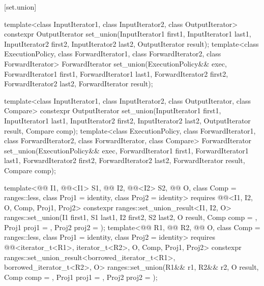 [set.union]{}

%
\begin{itemdecl}
template<class InputIterator1, class InputIterator2, class OutputIterator>
  constexpr OutputIterator
    set_union(InputIterator1 first1, InputIterator1 last1,
              InputIterator2 first2, InputIterator2 last2,
              OutputIterator result);
template<class ExecutionPolicy, class ForwardIterator1, class ForwardIterator2,
         class ForwardIterator>
  ForwardIterator
    set_union(ExecutionPolicy&& exec,
              ForwardIterator1 first1, ForwardIterator1 last1,
              ForwardIterator2 first2, ForwardIterator2 last2,
              ForwardIterator result);

template<class InputIterator1, class InputIterator2, class OutputIterator, class Compare>
  constexpr OutputIterator
    set_union(InputIterator1 first1, InputIterator1 last1,
              InputIterator2 first2, InputIterator2 last2,
              OutputIterator result, Compare comp);
template<class ExecutionPolicy, class ForwardIterator1, class ForwardIterator2,
         class ForwardIterator, class Compare>
  ForwardIterator
    set_union(ExecutionPolicy&& exec,
              ForwardIterator1 first1, ForwardIterator1 last1,
              ForwardIterator2 first2, ForwardIterator2 last2,
              ForwardIterator result, Compare comp);

template<@@ I1, @@<I1> S1, @@ I2, @@<I2> S2,
         @@ O, class Comp = ranges::less,
         class Proj1 = identity, class Proj2 = identity>
  requires @@<I1, I2, O, Comp, Proj1, Proj2>
  constexpr ranges::set_union_result<I1, I2, O>
    ranges::set_union(I1 first1, S1 last1, I2 first2, S2 last2, O result, Comp comp = {},
                      Proj1 proj1 = {}, Proj2 proj2 = {});
template<@@ R1, @@ R2, @@ O,
         class Comp = ranges::less, class Proj1 = identity, class Proj2 = identity>
  requires @@<iterator_t<R1>, iterator_t<R2>, O, Comp, Proj1, Proj2>
  constexpr ranges::set_union_result<borrowed_iterator_t<R1>, borrowed_iterator_t<R2>, O>
    ranges::set_union(R1&& r1, R2&& r2, O result, Comp comp = {},
                      Proj1 proj1 = {}, Proj2 proj2 = {});
\end{itemdecl}

